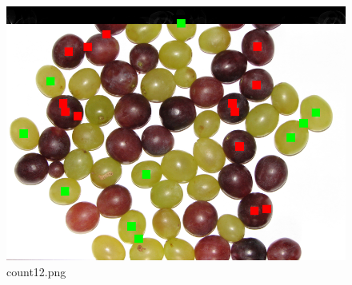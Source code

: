 \documentclass{classrep}
\begin{document}
\begin{figure}
\begin{minipage}{0.3\linewidth}
    \includegraphics[width=\textwidth]{gfx/count12_overlayed.png}
    \caption{count12.png}
    \label{fig:c12}
  \end{minipage}
\end{figure}
\end{document}
